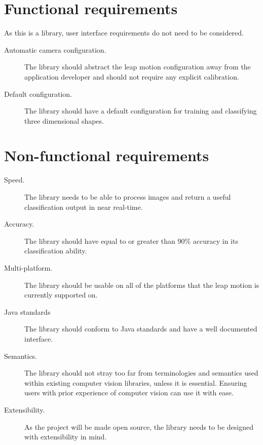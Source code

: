 \documentclass[11pt,oneside]{report}
\begin{document}
		\section{Functional requirements}
			
			As this is a library, user interface requirements do not need to be considered.
			\begin{description}
				\item[Automatic camera configuration.] The library should abstract the leap motion configuration away from the application developer and should not require any explicit calibration.
				\item[Default configuration.] The library should have a default configuration for training and classifying three dimensional shapes.
			\end{description}
				
			
		\section{Non-functional requirements}
			\begin{description}
				\item[Speed.] The library needs to be able to process images and return a useful classification output in near real-time.
				\item[Accuracy.] The library should have equal to or greater than 90\% accuracy in its classification ability.
				\item[Multi-platform.] The library should be usable on all of the platforms that the leap motion is currently supported on.
				\item[Java standards] The library should conform to Java standards and have a well documented interface.
				\item[Semantics.] The library should not stray too far from terminologies and semantics used within existing computer vision libraries, unless it is essential. Ensuring users with prior experience of computer vision can use it with ease.
				\item[Extensibility.] As the project will be made open source, the library needs to be designed with extensibility in mind.
			\end{description}
			
\end{document}
